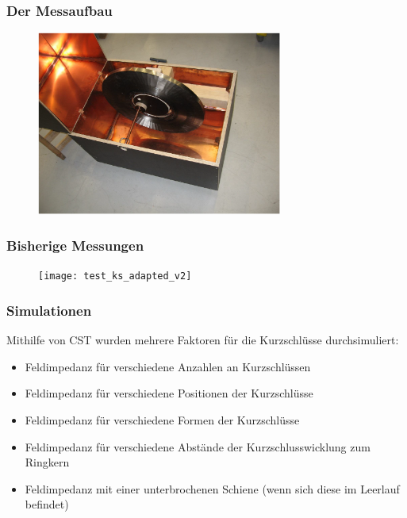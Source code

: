 \documentclass[accentcolor=tud9b, colorbacktitle, inverttitle]{tudbeamer}
\begin{document}
\begin{frame}\frametitle{Der Messaufbau}
\vspace{-2em}
	\begin{figure}[h]
		\centering
		\includegraphics[width=0.72\textwidth]{opentest}
	\end{figure}
\end{frame}




\begin{frame}\frametitle{Bisherige Messungen}
	\vspace{-2em}
	\begin{figure}[h]
		\centering
		\texttt{[image: test\_ks\_adapted\_v2]}
	\end{figure}
\end{frame}




\begin{frame}\frametitle{Simulationen}
Mithilfe von CST wurden mehrere Faktoren f\"ur die Kurzschl\"usse durchsimuliert:
\begin{itemize}
	\item Feldimpedanz f\"ur verschiedene Anzahlen an Kurzschl\"ussen
	\item Feldimpedanz f\"ur verschiedene Positionen der Kurzschl\"usse
	\item Feldimpedanz f\"ur verschiedene Formen der Kurzschl\"usse
	\item Feldimpedanz f\"ur verschiedene Abst\"ande der Kurzschlusswicklung zum Ringkern
	\item Feldimpedanz mit einer unterbrochenen Schiene (wenn sich diese im Leerlauf befindet)
\end{itemize}
\end{frame}
\end{document}

